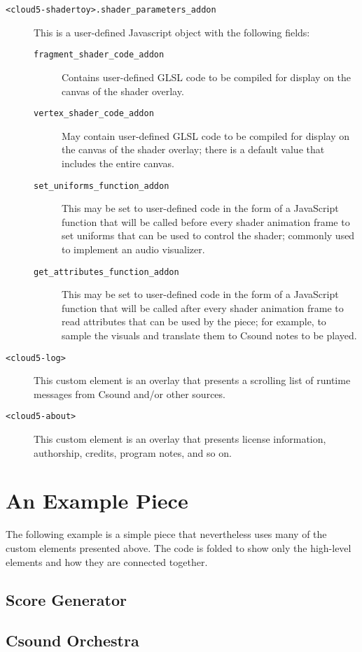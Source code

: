 \documentclass[runningheads,a4paper]{llncs}
\begin{document}
\begin{description}
\item[\texttt{<cloud5-shadertoy>.shader\_parameters\_addon}] This is a user-defined Javascript object with the following fields:
\begin{description}
\item[\texttt{fragment\_shader\_code\_addon}] Contains user-defined GLSL code to be compiled for display on the canvas of the shader overlay.
\item[\texttt{vertex\_shader\_code\_addon}] May contain user-defined GLSL code to be compiled for display on the canvas of the shader overlay; there is a default value that includes the entire canvas.
\item[\texttt{set\_uniforms\_function\_addon}] This may be set to user-defined code in the form of a JavaScript function that will be called before every shader animation frame to set uniforms that can be used to control the shader; commonly used to implement an audio visualizer.
\item[\texttt{get\_attributes\_function\_addon}] This may be set to user-defined code in the form of a JavaScript function that will be called after every shader animation frame to read attributes that can be used by the piece; for example, to sample the visuals and translate them to Csound notes to be played.
\end{description}
\item[\texttt{<cloud5-log>}] This custom element is an overlay that presents a scrolling list of runtime messages from Csound and/or other sources.
\item[\texttt{<cloud5-about>}] This custom element is an overlay that presents license information, authorship, credits, program notes, and so on.
\end{description}

\section{An Example Piece}

The following example is a simple piece that nevertheless uses many of the custom elements presented above. The code is folded to show only the high-level elements and how they are connected together.

\subsection{Score Generator}
\subsection{Csound Orchestra}
\end{document}

